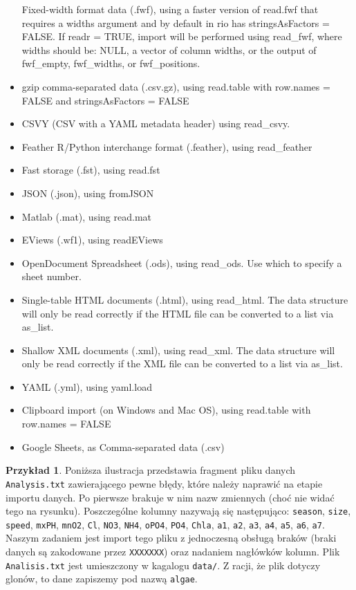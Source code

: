 \documentclass[
]{book}
\theoremstyle{plain}
\theoremstyle{definition}
\theoremstyle{definition}
\theoremstyle{definition}
\newtheorem{example}{Przykład}[chapter]
\theoremstyle{definition}
\theoremstyle{definition}
\theoremstyle{remark}
\begin{document}
\begin{itemize}
  Fixed-width format data (.fwf), using a faster version of read.fwf that requires a widths argument and by default in rio has stringsAsFactors = FALSE. If readr = TRUE, import will be performed using read\_fwf, where widths should be: NULL, a vector of column widths, or the output of fwf\_empty, fwf\_widths, or fwf\_positions.
\item
  gzip comma-separated data (.csv.gz), using read.table with row.names = FALSE and stringsAsFactors = FALSE
\item
  CSVY (CSV with a YAML metadata header) using read\_csvy.
\item
  Feather R/Python interchange format (.feather), using read\_feather
\item
  Fast storage (.fst), using read.fst
\item
  JSON (.json), using fromJSON
\item
  Matlab (.mat), using read.mat
\item
  EViews (.wf1), using readEViews
\item
  OpenDocument Spreadsheet (.ods), using read\_ods. Use which to specify a sheet number.
\item
  Single-table HTML documents (.html), using read\_html. The data structure will only be read correctly if the HTML file can be converted to a list via as\_list.
\item
  Shallow XML documents (.xml), using read\_xml. The data structure will only be read correctly if the XML file can be converted to a list via as\_list.
\item
  YAML (.yml), using yaml.load
\item
  Clipboard import (on Windows and Mac OS), using read.table with row.names = FALSE
\item
  Google Sheets, as Comma-separated data (.csv)
\end{itemize}

\begin{example}
\protect\hypertarget{exm:przyk1}{}\label{exm:przyk1}Poniższa ilustracja przedstawia fragment pliku danych \texttt{Analysis.txt} zawierającego pewne błędy, które należy naprawić na etapie importu danych. Po pierwsze brakuje w nim nazw zmiennych (choć nie widać tego na rysunku). Poszczególne kolumny nazywają się następująco: \texttt{season}, \texttt{size}, \texttt{speed}, \texttt{mxPH}, \texttt{mnO2}, \texttt{Cl}, \texttt{NO3}, \texttt{NH4}, \texttt{oPO4}, \texttt{PO4}, \texttt{Chla}, \texttt{a1}, \texttt{a2}, \texttt{a3}, \texttt{a4}, \texttt{a5}, \texttt{a6}, \texttt{a7}. Naszym zadaniem jest import tego pliku z jednoczesną obsługą braków (braki danych są zakodowane przez \texttt{XXXXXXX}) oraz nadaniem nagłówków kolumn. Plik \texttt{Analisis.txt} jest umieszczony w kagalogu \texttt{data/}. Z racji, że plik dotyczy glonów, to dane zapiszemy pod nazwą \texttt{algae}.
\end{example}
\end{document}
